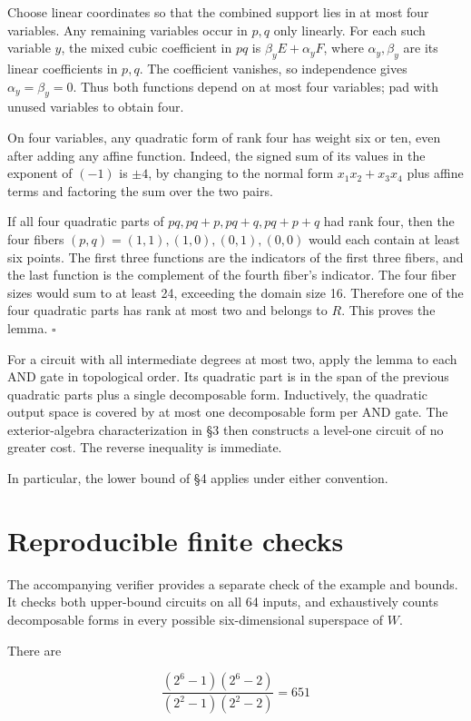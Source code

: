 Choose linear coordinates so that the combined support lies in at most four variables. Any remaining variables occur in $p,q$ only linearly. For each such variable $y$, the mixed cubic coefficient in $pq$ is $\beta_y E+\alpha_y F$, where $\alpha_y,\beta_y$ are its linear coefficients in $p,q$. The coefficient vanishes, so independence gives $\alpha_y=\beta_y=0$. Thus both functions depend on at most four variables; pad with unused variables to obtain four.

On four variables, any quadratic form of rank four has weight six or ten, even after adding any affine function. Indeed, the signed sum of its values in the exponent of $(-1)$ is $\pm4$, by changing to the normal form $x_1x_2+x_3x_4$ plus affine terms and factoring the sum over the two pairs.

If all four quadratic parts of $pq,pq+p,pq+q,pq+p+q$ had rank four, then the four fibers $(p,q)=(1,1),(1,0),(0,1),(0,0)$ would each contain at least six points. The first three functions are the indicators of the first three fibers, and the last function is the complement of the fourth fiber's indicator. The four fiber sizes would sum to at least 24, exceeding the domain size 16. Therefore one of the four quadratic parts has rank at most two and belongs to $R$. This proves the lemma. $\square$

For a circuit with all intermediate degrees at most two, apply the lemma to each AND gate in topological order. Its quadratic part is in the span of the previous quadratic parts plus a single decomposable form. Inductively, the quadratic output space is covered by at most one decomposable form per AND gate. The exterior-algebra characterization in \S{}3 then constructs a level-one circuit of no greater cost. The reverse inequality is immediate.

In particular, the lower bound of \S{}4 applies under either convention.

\section{Reproducible finite checks}

The accompanying verifier provides a separate check of the example and bounds. It checks both upper-bound circuits on all 64 inputs, and exhaustively counts decomposable forms in every possible six-dimensional superspace of $W$.

There are

\[\frac{(2^6-1)(2^6-2)}{(2^2-1)(2^2-2)}=651\]

